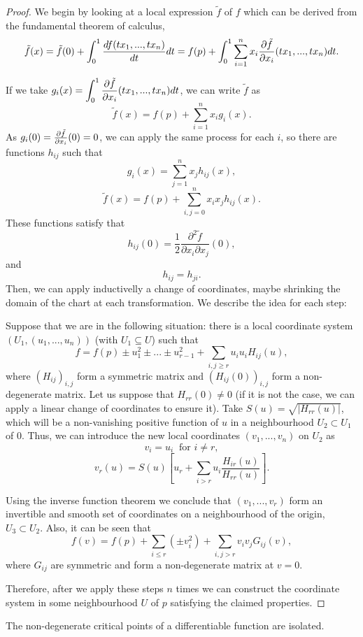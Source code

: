 \begin{proof} We begin by looking at a local expression $\tilde{f}$ of $f$ which can be derived from the fundamental theorem of calculus,
\[\tilde{f}(x) = \tilde{f}(0) + \int_0^1 \frac{df(tx_1,...,tx_n)}{dt} dt = f(p) + \int_0^1 \sum_{i=1}^n x_i \frac{\partial \tilde{f}}{\partial x_i}(tx_1,...,tx_n) dt .\]

If we take $g_i(x) = \displaystyle\int_0^1 \frac{\partial \tilde{f}}{\partial x_i}(tx_1,...,tx_n) dt$, we can write $\tilde{f}$ as
\[\tilde{f}(x) = f(p) + \sum_{i=1}^n x_i g_i(x) .\]
As $g_i(0) = \frac{\partial \tilde{f}}{\partial x_i}(0) = 0$, we can apply the same process for each $i$, so there are functions $h_{ij}$ such that
\[g_i(x) = \sum_{j=1}^n x_j h_{ij}(x) ,\]
\[\tilde{f}(x) = f(p) + \sum_{i,j=0}^n x_i x_j h_{ij}(x) .\]
These functions satisfy that
\[h_{ij}(0) = \frac12 \frac{\partial^2 \tilde{f}}{\partial x_i \partial x_j}(0) ,\]
and
\[h_{ij} = h_{ji} .\]
Then, we can apply inductivelly a change of coordinates, maybe shrinking the domain of the chart at each transformation. We describe the idea for each step:

Suppose that we are in the following situation: there is a local coordinate system $(U_1, (u_1,...,u_n))$ (with $U_1 \subseteq U$) such that
\[f = f(p) \pm u_1^2 \pm ... \pm u_{r-1}^2 + \sum_{i,j \geq r} u_i u_i H_{ij}(u) ,\]
where $(H_{ij})_{i,j}$ form a symmetric matrix and $(H_{ij}(0))_{i,j}$ form a non-degenerate matrix. Let us suppose that $H_{rr}(0) \neq 0$ (if it is not the case, we can apply a linear change of coordinates to ensure it). Take $S(u) = \sqrt{|H_{rr}(u)|}$, which will be a non-vanishing positive function of $u$ in a neighbourhood $U_2 \subset U_1$ of $0$. Thus, we can introduce the new local coordinates $(v_1,...,v_n)$ on $U_2$ as
\[v_i = u_i \ \text{ for } i \neq r,\]
\[v_r(u) = S(u) \left[ u_r + \sum_{i > r} u_i \frac{H_{ir}(u)}{H_{rr}(u)} \right] .\]

Using the inverse function theorem we conclude that $(v_1,...,v_r)$ form an invertible and smooth set of coordinates on a neighbourhood of the origin, $U_3 \subset U_2$. Also, it can be seen that
\[f(v) = f(p) + \sum_{i \leq r} \left(\pm v_i^2\right) + \sum_{i,j > r} v_i v_j G_{ij}(v) ,\]
where $G_{ij}$ are symmetric and form a non-degenerate matrix at $v = 0$.

Therefore, after we apply these steps $n$ times we can construct the coordinate system in some neighbourhood $U$ of $p$ satisfying the claimed properties.
\end{proof}

\begin{coro} \label{morselemma_coro}
The non-degenerate critical points of  a differentiable function are isolated.
\end{coro}

